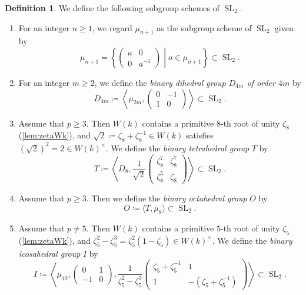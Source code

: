 \documentclass[uplatex,11pt,a4paper]{amsart} %
\numberwithin{equation}{section}
\numberwithin{figure}{section}
\numberwithin{table}{section}
\theoremstyle{plain}
\theoremstyle{definition}
\newtheorem{definition}[theorem]{Definition}
\DeclareMathOperator{\SL}{SL}
\newcommand{\relmiddle}[1]{\mathrel{}\middle#1\mathrel{}} %
\begin{document}
\begin{definition}
We define the following subgroup schemes of $\SL_2$.
  \begin{enumerate}
  \item For an integer $n\geq 1$, we regard $\mu_{n+1}$ as the subgroup scheme of $\SL_2$ given by
  \[
  \mu_{n+1} =
  \left\{
  \begin{pmatrix}
  a & 0 \\
  0 & a^{-1}
  \end{pmatrix}
  \relmiddle| a\in \mu_{n+1}\right\} \subset \SL_2.
  \]
  \item For an integer $m\geq 2$, we define the \emph{binary dihedral group $D_{4m}$ of order $4m$} by
  \[
  D_{4m} \coloneqq \left\langle \mu_{2m}, \begin{pmatrix} 0 & -1 \\ 1 & 0 \end{pmatrix} \right\rangle \subset \SL_2.
  \]
  \item Assume that $p\geq 3$. Then $W(k)$ contains a primitive $8$-th root of unity $\zeta_8$ (\cref{lem:zetaWk}), and $\sqrt{2}\coloneqq \zeta_8+\zeta_8^{-1}\in W(k)$ satisfies $(\sqrt{2})^2=2\in W(k)^\times$. We define the \emph{binary tetrahedral group} $T$ by
  \[
  T \coloneqq \left\langle D_8, \frac{1}{\sqrt{2}} \begin{pmatrix} \zeta_8^7 & \zeta_8^7 \\ \zeta_8^5 & \zeta_8 \end{pmatrix} \right\rangle \subset \SL_2.
  \]
  \item Assume that $p\geq 3$. Then we define the \emph{binary octahedral group} $O$ by
  \[
  O\coloneqq\langle T,\mu_8\rangle\subset\SL_2.
  \]
  \item Assume that $p\neq 5$. Then $W(k)$ contains a primitive $5$-th root of unity $\zeta_5$ (\cref{lem:zetaWk}), and $\zeta_5^2-\zeta_5^3=\zeta_5^2(1-\zeta_5)\in W(k)^\times$. We define the \emph{binary icosahedral group} $I$ by
  \[
  I \coloneqq \left\langle \mu_{10},\begin{pmatrix} 0 & 1 \\ -1 & 0 \end{pmatrix}, \frac{1}{\zeta_5^2-\zeta_5^3} \begin{pmatrix} \zeta_5+\zeta_5^{-1} & 1 \\ 1 & -(\zeta_5+\zeta_5^{-1}) \end{pmatrix} \right\rangle \subset\SL_2.
  \]
  \end{enumerate}
\end{definition}
\end{document}
